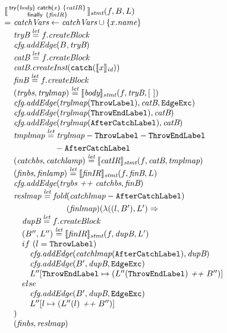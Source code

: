 \[\begin{array}{l@{}l@{~}l}
\lefteqn{\transfun{\irtryfull{\emph{body}}{x}{\emph{catIR}}{\emph{finIR}}}_{\emph{stmt}}(f, B, L)}\\
& = & \emph{catchVars} \leftarrow \emph{catchVars} \cup \{ x.\emph{name} \}\\
& & \emph{tryB} \letval f.\emph{createBlock}\\
& & \emph{cfg}.\emph{addEdge}(B, \emph{tryB})\\
& & \emph{catB} \letval f.\emph{createBlock}\\
& & \emph{catB}.\emph{createInst}(\TT{catch}(\transfun{x}_{\emph{id}}))\\
& & \emph{finB} \letval f.\emph{createBlock}\\
& & (\emph{trybs}, \emph{trylmap}) \letval \transfun{\emph{body}}_{\emph{stmt}}(f, \emph{tryB}, [\ ])\\
& & \emph{cfg}.\emph{addEdge}(\emph{trylmap}(\ThrowLabel), \emph{catB}, \EdgeExc)\\
& & \emph{cfg}.\emph{addEdge}(\emph{trylmap}(\ThrowEndLabel), \emph{catB})\\
& & \emph{cfg}.\emph{addEdge}(\emph{trylmap}(\AfterCatchLabel), \emph{catB})\\
& & \emph{tmplmap} \letval \emph{trylmap} - \ThrowLabel - \ThrowEndLabel\\
&& \phantom{\emph{tmplmap} \letval} - \AfterCatchLabel\\
& & (\emph{catchbs}, \emph{catchlamp}) \letval \transfun{\emph{catIR}}_{\emph{stmt}}(f, \emph{catB}, \emph{tmplmap})\\
& & (\emph{finbs}, \emph{finlamp}) \letval \transfun{\emph{finIR}}_{\emph{stmt}}(f, \emph{finB}, L)\\
& & \emph{cfg}.\emph{addEdge}(\emph{trybs} ~\emph{++}~ \emph{catchbs}, \emph{finB})\\
& & \emph{reslmap} \letval \fold(\emph{catchlmap} - \AfterCatchLabel)\\
& & \phantom{\emph{reslmap} \letval \fold}(\emph{finlmap})
(\lambda((l, B'), L') \Rightarrow \\
& & \quad \emph{dupB} \letval f.\emph{createBlock}\\
& & \quad (B'', L'') \letval \transfun{\emph{finIR}}_{\emph{stmt}}(f, \emph{dupB}, L')\\
& & \quad if\ (l = \ThrowLabel)\\
& & \quad \phantom{if} \emph{cfg}.\emph{addEdge}(\emph{catchlmap}(\AfterCatchLabel), \emph{dupB})\\
& & \quad \phantom{if} \emph{cfg}.\emph{addEdge}(B', \emph{dupB}, \EdgeExc)\\
& & \quad \phantom{if} L''[\ThrowEndLabel \mapsto (L''(\ThrowEndLabel) ~\emph{++}~ B'')]\\
& & \quad else\\
& & \quad \phantom{if} \emph{cfg}.\emph{addEdge}(B', \emph{dupB}, \EdgeExc)\\
& & \quad \phantom{if} L''[l \mapsto (L''(l) ~\emph{++}~ B'')]\\
& & )\\
& & (\emph{finbs}, \emph{reslmap})\\
& & \\
\end{array}
\]

